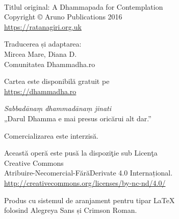
\cleartoverso
\thispagestyle{empty}

{\copyrightsize
\centering
\setlength{\parindent}{0pt}%
\setlength{\parskip}{0.8\baselineskip}%

\thetitle\\
\theauthor

Titlul original: A Dhammapada for Contemplation\\
Copyright © Aruno Publications 2016\\
\href{https://ratanagiri.org.uk}{https://ratanagiri.org.uk}

Traducerea și adaptarea:\\
Mircea Mare, Diana D.\\
Comunitatea Dhammadha.ro

Cartea este disponibilă gratuit pe\\
\href{https://dhammadha.ro}{https://dhammadha.ro}


\theEditionInfo

\vfill

\emph{Sabbadānaṃ dhammadānaṃ jinati}\\
„Darul Dhamma e mai presus oricărui alt dar.”

Comercializarea este interzisă.

Această operă este pusă la dispoziţie sub Licenţa\\
Creative Commons\\
Atribuire-Necomercial-FărăDerivate 4.0 Internațional.\\
\href{http://creativecommons.org/licenses/by-nc-nd/4.0/}{http://creativecommons.org/licenses/by-nc-nd/4.0/}

Produs cu sistemul de aranjament pentru tipar \LaTeX\,\\
folosind Alegreya Sans și Crimson Roman.

}
